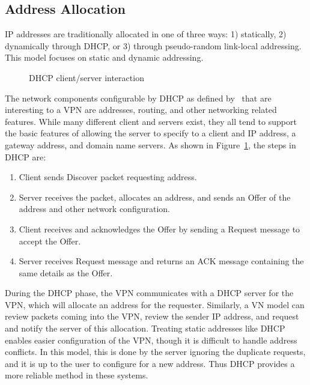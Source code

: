 \subsection{Address Allocation}
IP addresses are traditionally allocated in one of three ways: 1) statically, 2)
dynamically through DHCP, or 3) through pseudo-random link-local addressing.
This model focuses on static and dynamic addressing.

\begin{figure}
\centering
{}
\caption{DHCP client/server interaction}
\label{fig:dhcp}
\end{figure}

The network components configurable by DHCP as defined by~\cite{dhcp0,dhcp1}
that are interesting to a VPN are addresses, routing, and other networking
related features.  While many different client and servers exist, they all tend
to support the basic features of allowing the server to specify to a client and
IP address, a gateway address, and domain name servers.  As shown in
Figure~\ref{fig:dhcp}, the steps in DHCP are:

\begin{enumerate}

\item Client sends Discover packet requesting address.

\item Server receives the packet, allocates an address, and sends an Offer of
the address and other network configuration.

\item Client receives and acknowledges the Offer by sending a Request message
to accept the Offer.

\item Server receives Request message and returns an ACK message containing the
same details as the Offer.

\end{enumerate}

During the DHCP phase, the VPN communicates with a DHCP server for the VPN,
which will allocate an address for the requester.  Similarly, a VN model can
review packets coming into the VPN, review the sender IP address, and request
and notify the server of this allocation.  Treating static addresses like DHCP
enables easier configuration of the VPN, though it is difficult to handle
address conflicts.  In this model, this is done by the server ignoring the
duplicate requests, and it is up to the user to configure for a new address.
Thus DHCP provides a more reliable method in these systems.

